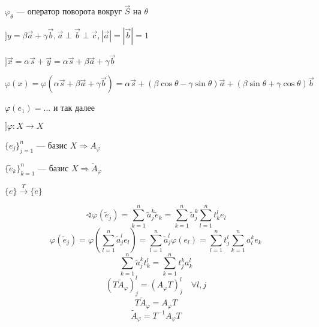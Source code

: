 \begin{example}
    $\varphi_\theta$ --- оператор поворота вокруг $\vec S$ на $\theta$

    $] y = \beta\vec a + \gamma\vec b, \vec a\perp\vec b\perp \vec c, |\vec a|=|\vec b|=1$

    $]\vec x = \alpha\vec s + \vec y = \alpha\vec s + \beta\vec a + \gamma\vec b$

    $\varphi(x)=\varphi(\alpha\vec s + \beta\vec a + \gamma\vec b) = \alpha\vec s + (\beta\cos\theta-\gamma\sin\theta)\vec a + (\beta\sin\theta+\gamma\cos\theta)\vec b$

    $\varphi(e_1)=...$ и так далее
\end{example}

$] \varphi : X \to X$

$\{e_j\}_{j=1}^n$ --- базис $X \Rightarrow A_\varphi$

$\{\tilde e_k\}_{k=1}^n$ --- базис $X \Rightarrow \tilde A_\varphi$

$\{e\}\stackrel{T}{\to}\{\tilde e\}$

$$\sphericalangle \varphi(\tilde e_j)=\sum\limits_{k=1}^n\tilde a_j^k \tilde e_k=\sum\limits_{k=1}^n\tilde a_j^k \sum\limits_{l=1}^n t_k^le_l$$
$$\varphi(\tilde e_j) = \varphi\left(\sum\limits_{l=1}^n \tilde a_j^le_l\right)=\sum\limits_{l=1}^n \tilde a_j^l\varphi (e_l)=\sum\limits_{l=1}^n t_j^l\sum\limits_{k=1}^n a_l^k e_k$$
$$\sum\limits_{k=1}^n \tilde a_j^k t_k^l = \sum\limits_{k=1}^n t_j^k a_k^l$$
$$(T\tilde A_\varphi)_j^l=(A_\varphi T)_j^l \quad \forall l, j$$
$$T\tilde A_\varphi=A_\varphi T$$
$$\tilde A_\varphi=T^{-1}A_\varphi T$$


